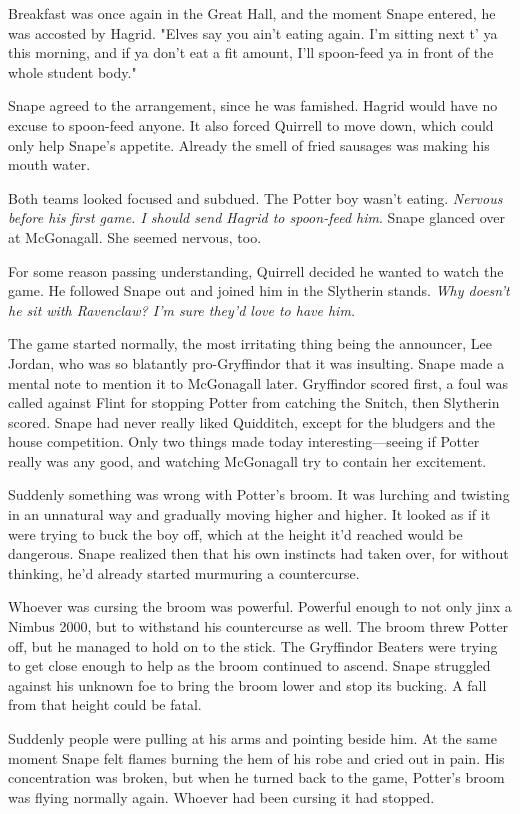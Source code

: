 Breakfast was once again in the Great Hall, and the moment Snape entered, he was accosted by Hagrid. "Elves say you ain't eating again. I'm sitting next t' ya this morning, and if ya don't eat a fit amount, I'll spoon-feed ya in front of the whole student body."

Snape agreed to the arrangement, since he was famished. Hagrid would have no excuse to spoon-feed anyone. It also forced Quirrell to move down, which could only help Snape's appetite. Already the smell of fried sausages was making his mouth water.

Both teams looked focused and subdued. The Potter boy wasn't eating. \emph{Nervous before his first game. I should send Hagrid to spoon-feed him}. Snape glanced over at McGonagall. She seemed nervous, too.

For some reason passing understanding, Quirrell decided he wanted to watch the game. He followed Snape out and joined him in the Slytherin stands. \emph{Why doesn't he sit with Ravenclaw? I'm sure they'd love to have him.}

The game started normally, the most irritating thing being the announcer, Lee Jordan, who was so blatantly pro-Gryffindor that it was insulting. Snape made a mental note to mention it to McGonagall later. Gryffindor scored first, a foul was called against Flint for stopping Potter from catching the Snitch, then Slytherin scored. Snape had never really liked Quidditch, except for the bludgers and the house competition. Only two things made today interesting—seeing if Potter really was any good, and watching McGonagall try to contain her excitement.

Suddenly something was wrong with Potter's broom. It was lurching and twisting in an unnatural way and gradually moving higher and higher. It looked as if it were trying to buck the boy off, which at the height it'd reached would be dangerous. Snape realized then that his own instincts had taken over, for without thinking, he'd already started murmuring a countercurse.

Whoever was cursing the broom was powerful. Powerful enough to not only jinx a Nimbus 2000, but to withstand his countercurse as well. The broom threw Potter off, but he managed to hold on to the stick. The Gryffindor Beaters were trying to get close enough to help as the broom continued to ascend. Snape struggled against his unknown foe to bring the broom lower and stop its bucking. A fall from that height could be fatal.

Suddenly people were pulling at his arms and pointing beside him. At the same moment Snape felt flames burning the hem of his robe and cried out in pain. His concentration was broken, but when he turned back to the game, Potter's broom was flying normally again. Whoever had been cursing it had stopped.


